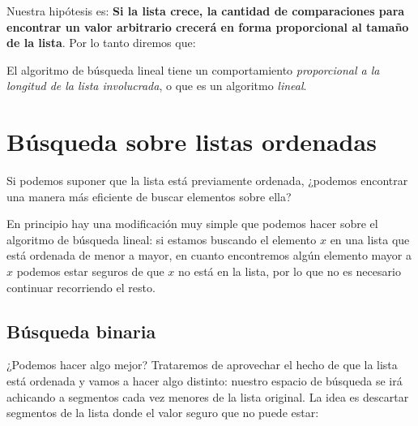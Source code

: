 Nuestra hipótesis es: {\bf Si la lista crece, la cantidad de comparaciones
para encontrar un valor arbitrario crecerá en forma proporcional al tamaño de
la lista}. Por lo tanto diremos que:

\begin{observacion}
El algoritmo de búsqueda lineal tiene un comportamiento \emph{proporcional a la
longitud de la lista involucrada}, o que es un algoritmo \emph{lineal}.
\end{observacion}

\section{Búsqueda sobre listas ordenadas}

Si podemos suponer que la lista está previamente ordenada,
¿podemos encontrar una manera más eficiente de buscar elementos sobre ella?

En principio hay una modificación muy simple que podemos hacer sobre el
algoritmo de búsqueda lineal: si estamos buscando el elemento $x$ en una
lista que está ordenada de menor a mayor, en cuanto encontremos algún elemento
mayor a $x$ podemos estar seguros de que $x$ no está en la lista, por lo que no
es necesario continuar recorriendo el resto.


\subsection*{Búsqueda binaria}

¿Podemos hacer algo mejor? Trataremos de aprovechar el hecho de que la lista
está ordenada y vamos a hacer algo distinto: nuestro espacio de búsqueda se
irá achicando a segmentos cada vez menores de la lista original.
La idea es descartar segmentos de la lista donde el valor seguro que no puede
estar:

